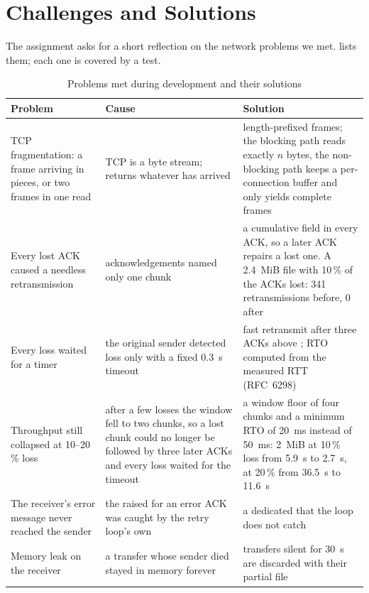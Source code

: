 \section{Challenges and Solutions}\label{sec:challenges}

The assignment asks for a short reflection on the network problems we met. 
lists them; each one is covered by a test.

\begin{table}[H]\centering\footnotesize
\caption{Problems met during development and their solutions}\label{tab:challenges}
\begin{tabularx}{\textwidth}{@{}>{\raggedright\arraybackslash}p{3.6cm} Y Y@{}}
\toprule
\textbf{Problem} & \textbf{Cause} & \textbf{Solution} \\
\midrule
TCP fragmentation: a frame arriving in pieces, or two frames in one read &
TCP is a byte stream;  returns whatever has arrived &
length-prefixed frames; the blocking path reads exactly $n$ bytes, the non-blocking path keeps a per-connection buffer and only yields complete frames \\
Every lost ACK caused a needless retransmission &
acknowledgements named only one chunk &
a cumulative field  in every ACK, so a later ACK repairs a lost one. A \SI{2.4}{MiB} file with 10\,\% of the ACKs lost: 341 retransmissions before, 0 after \\
Every loss waited for a timer &
the original sender detected loss only with a fixed \SI{0.3}{s} timeout &
fast retransmit after three ACKs above ; RTO computed from the measured RTT (RFC~6298) \\
Throughput still collapsed at 10--20\,\% loss &
after a few losses the window fell to two chunks, so a lost chunk could no longer be followed by three later ACKs and every loss waited for the timeout &
a window floor of four chunks and a minimum RTO of \SI{20}{ms} instead of \SI{50}{ms}: \SI{2}{MiB} at 10\,\% loss from \SI{5.9}{s} to \SI{2.7}{s}, at 20\,\% from \SI{36.5}{s} to \SI{11.6}{s} \\
The receiver's error message never reached the sender &
the  raised for an error ACK was caught by the retry loop's own  &
a dedicated  that the loop does not catch \\
Memory leak on the receiver &
a transfer whose sender died stayed in memory forever &
transfers silent for \SI{30}{s} are discarded with their partial file \\

\end{tabularx}
\end{table}
